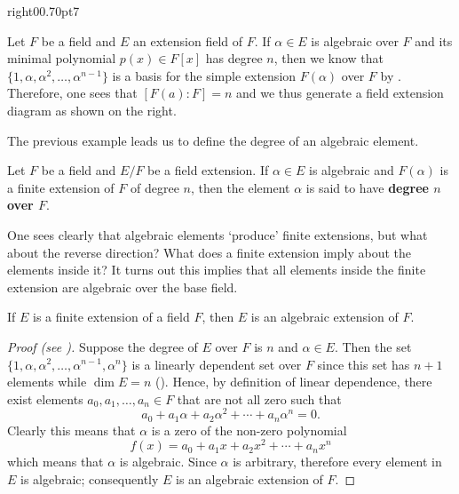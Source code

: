 \begin{examplewithcutout}{right}{0}{0.7\textwidth}{0pt}{7}{
    \begin{figure}[H]
        \centering
    \end{figure}
}
    Let $F$ be a field and $E$ an extension field of $F$. If $\alpha \in E$ is algebraic over $F$ and its minimal polynomial $p(x) \in F[x]$ has degree $n$, then we know that $\{1, \alpha, \alpha^2, \dots, \alpha^{n-1}\}$ is a basis for the simple extension $F(\alpha)$ over $F$ by . Therefore, one sees that $[F(a): F] = n$ and we thus generate a field extension diagram as shown on the right.
\end{examplewithcutout}

The previous example leads us to define the degree of an algebraic element.

\begin{definition}
    Let $F$ be a field and $E/F$ be a field extension. If $\alpha \in E$ is algebraic and $F(\alpha)$ is a finite extension of $F$ of degree $n$, then the element $\alpha$ is said to have \textbf{degree $n$ over $F$}.
\end{definition}

One sees clearly that algebraic elements `produce' finite extensions, but what about the reverse direction? What does a finite extension imply about the elements inside it? It turns out this implies that all elements inside the finite extension are algebraic over the base field.

\begin{theorem}
    If $E$ is a finite extension of a field $F$, then $E$ is an algebraic extension of $F$.
\end{theorem}
\begin{proof}[Proof (see {\cite[Theorem 21.4]{gallian_2016}})]
    Suppose the degree of $E$ over $F$ is $n$ and $\alpha \in E$. Then the set $\{1, \alpha, \alpha^2, \dots, \alpha^{n-1}, \alpha^n\}$ is a linearly dependent set over $F$ since this set has $n + 1$ elements while $\dim E = n$ (). Hence, by definition of linear dependence, there exist elements $a_0, a_1, \dots, a_n \in F$ that are not all zero such that
    \[
        a_0 + a_1\alpha + a_2\alpha^2 + \cdots + a_n\alpha^n = 0.
    \]
    Clearly this means that $\alpha$ is a zero of the non-zero polynomial
    \[
        f(x) = a_0 + a_1x + a_2x^2 + \cdots + a_nx^n
    \]
    which means that $\alpha$ is algebraic. Since $\alpha$ is arbitrary, therefore every element in $E$ is algebraic; consequently $E$ is an algebraic extension of $F$.
\end{proof}


